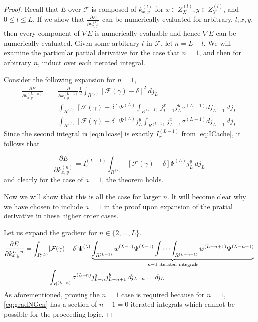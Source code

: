 \begin{proof}
  Recall that $E$ over $\mathcal{F}$ is composed of $k^{(l)}_{x,y}$ for $x \in Z^{(l)}_X, y \in Z^{(l)}_Y$, and $0\leq l \leq L$.
  If we show that $\frac{\partial E}{\partial k^{(l)}_{x,y}}$ can be numerically evaluated for arbitrary, $l,x,y$, then every component of $\nabla E$ is numerically evaluable and hence $\nabla E$ can be numerically evaluated.
  Given some arbitrary $l$ in $\mathcal{F}$, let $n = L - l$.
  We will examine the particular partial derivative for the case that $n = 1$, and then for arbitrary $n$, induct over each iterated integral.

  Consider the following expansion for $n = 1$,
  \begin{align}
  \frac{\partial E}{\partial k^{(L-n)}_{x,y}} &= 
    \frac{\partial}{\partial k^{(L-1)}_{x,y}} 
    \frac{1}{2} \int_{R^{(l)}} \left[\mathcal{F}(\gamma) - \delta\right]^2\ dj_L \nonumber \\
  &= \int_{R^{(l)}} \left[\mathcal{F}(\gamma) - \delta\right] \Psi^{(L)} 
    \int_{R^{(l-1)}} j_{L-1}^x j_{L}^y \sigma^{(L-1)} dj_{L-1}\ dj_L \nonumber \\
  &= \int_{R^{(l)}} \left[\mathcal{F}(\gamma) - \delta\right] \Psi^{(L)} j_{L}^y 
    \int_{R^{(l-1)}} j_{L-1}^x \sigma^{(L-1)} dj_{L-1}\ dj_L \label{eq:n1case}
  \end{align}
  Since the second integral in \eqref{eq:n1case} is exactly $I^{(L-1)}_x$ from    \eqref{eq:ICache}, it follows that 
  
  \begin{equation}
  \frac{\partial E}{\partial k^{(n)}_{x,y}} = I^{(L-1)}_x
    \int_{R^{(l)}} \left[\mathcal{F}(\gamma) - \delta\right] \Psi^{(L)} j_{L}^y  \ dj_L
  \end{equation}
  and clearly for the case of $n=1$, the theorem holds. 

  Now we will show that this is all the case for larger $n$. 
  It will become clear why we have chosen to include $n=1$ in the proof upon expansion of the pratial derivative in these higher order cases.

  Let us expand the gradient for $n\in \{2,\dots,L\}$.
  \begin{equation} \label{eq:gradNGen}
  \begin{aligned} 
  \frac{\partial  E}{\partial k^{L-n}_{x,y}} = 
  \int_{R^{(L)}}  &[\mathcal{F}(\gamma)-\delta] \Psi^{(L)} 
   \underbrace{\int_{R^{(L-1)}} w^{(L-1)} \Psi^{(L-1)} 
  \idotsint_{R^{(L-n+1)}} w^{(L-n+1)} \Psi^{(L-n+1)}}_{n-1\text{ iterated integrals}} \\ 
    &\int_{R^{(L-n)}} \sigma^{(L-n)} j^{a}_{L-n}j^{b}_{L-n+1}\; dj_{L-n}\dots dj_L
  \end{aligned}
  \end{equation}
  As aforementioned, proving the $n=1$ case is required because for $n=1$, \eqref{eq:gradNGen} has a section of $n-1 = 0$ iterated integrals which cannot be possible for the proceeding logic.


\end{proof}
